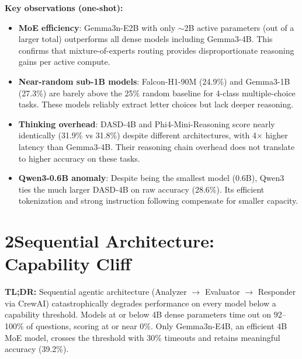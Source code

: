 \documentclass[11pt,letterpaper]{article}
\begin{document}
\noindent\textbf{Key observations (one-shot):}
\begin{itemize}
  \item \textbf{MoE efficiency}: Gemma3n-E2B with only $\sim$2B active parameters (out of a
    larger total) outperforms all dense models including Gemma3-4B. This confirms that
    mixture-of-experts routing provides disproportionate reasoning gains per active compute.
  \item \textbf{Near-random sub-1B models}: Falcon-H1-90M (24.9\%) and Gemma3-1B (27.3\%) are
    barely above the 25\% random baseline for 4-class multiple-choice tasks. These models
    reliably extract letter choices but lack deeper reasoning.
  \item \textbf{Thinking overhead}: DASD-4B and Phi4-Mini-Reasoning score nearly identically
    (31.9\% vs 31.8\%) despite different architectures, with 4$\times$ higher latency than
    Gemma3-4B. Their reasoning chain overhead does not translate to higher accuracy on these tasks.
  \item \textbf{Qwen3-0.6B anomaly}: Despite being the smallest model (0.6B), Qwen3 ties the
    much larger DASD-4B on raw accuracy (28.6\%). Its efficient tokenization and strong
    instruction following compensate for smaller capacity.
\end{itemize}

\newpage

\section*{2\quad Sequential Architecture: Capability Cliff}

\noindent\textbf{TL;DR:} Sequential agentic architecture (Analyzer $\to$ Evaluator $\to$ Responder
via CrewAI) catastrophically degrades performance on every model below a capability threshold.
Models at or below 4B dense parameters time out on 92--100\% of questions, scoring at or near 0\%.
Only Gemma3n-E4B, an efficient 4B MoE model, crosses the threshold with 30\% timeouts and retains
meaningful accuracy (39.2\%).

\vspace{0.2cm}
\end{document}
